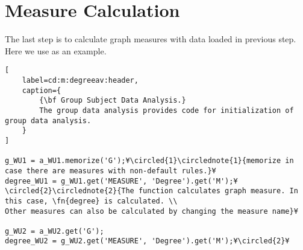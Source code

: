 \documentclass{tufte-handout}
\begin{document}
\section{Measure Calculation}
The last step is to calculate graph measures with data loaded in previous step. Here we use  as an example.
\begin{lstlisting}[
	label=cd:m:degreeav:header,
	caption={
		{\bf Group Subject Data Analysis.}
		The group data analysis provides code for initialization of group data analysis.
	}
]

g_WU1 = a_WU1.memorize('G');¥\circled{1}\circlednote{1}{memorize in case there are measures with non-default rules.}¥
degree_WU1 = g_WU1.get('MEASURE', 'Degree').get('M');¥\circled{2}\circlednote{2}{The function calculates graph measure. In this case, \fn{degree} is calculated. \\
Other measures can also be calculated by changing the measure name}¥

g_WU2 = a_WU2.get('G');
degree_WU2 = g_WU2.get('MEASURE', 'Degree').get('M');¥\circled{2}¥
\end{lstlisting}



\end{document}
